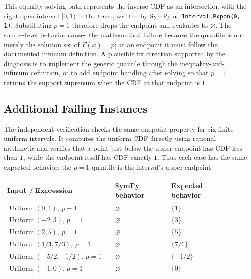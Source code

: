 \documentclass[11pt]{article}
\begin{document}
This equality-solving path represents the inverse CDF as an intersection with the right-open interval \([0,1)\) in the trace, written by SymPy as \texttt{Interval.Ropen(0, 1)}.  Substituting \(p=1\) therefore drops the endpoint and evaluates to \(\varnothing\).  The source-level behavior causes the mathematical failure because the quantile is not merely the solution set of \(F(x)=p\); at an endpoint it must follow the documented infimum definition.  A plausible fix direction supported by the diagnosis is to implement the generic quantile through the inequality-and-infimum definition, or to add endpoint handling after solving so that \(p=1\) returns the support supremum when the CDF at that endpoint is \(1\).

\subsection{Additional Failing Instances}

The independent verification checks the same endpoint property for six finite uniform intervals.  It computes the uniform CDF directly using rational arithmetic and verifies that a point just below the upper endpoint has CDF less than \(1\), while the endpoint itself has CDF exactly \(1\).  Thus each case has the same expected behavior: the \(p=1\) quantile is the interval's upper endpoint.

\begin{center}
\small
\renewcommand{\arraystretch}{1.3}
\begin{tabular}{@{}>{\raggedright\arraybackslash}p{0.44\linewidth}>{\raggedright\arraybackslash}p{0.23\linewidth}>{\raggedright\arraybackslash}p{0.23\linewidth}@{}}
\toprule
\textbf{Input / Expression} & \textbf{SymPy behavior} & \textbf{Expected behavior} \\
\midrule
\(\operatorname{Uniform}(0,1)\), \(p=1\) & \(\varnothing\) & \(\{1\}\) \\
\(\operatorname{Uniform}(-2,3)\), \(p=1\) & \(\varnothing\) & \(\{3\}\) \\
\(\operatorname{Uniform}(2,5)\), \(p=1\) & \(\varnothing\) & \(\{5\}\) \\
\(\operatorname{Uniform}(1/3,7/3)\), \(p=1\) & \(\varnothing\) & \(\{7/3\}\) \\
\(\operatorname{Uniform}(-5/2,-1/2)\), \(p=1\) & \(\varnothing\) & \(\{-1/2\}\) \\
\(\operatorname{Uniform}(-1,0)\), \(p=1\) & \(\varnothing\) & \(\{0\}\) \\
\bottomrule
\end{tabular}
\end{center}
\end{document}
